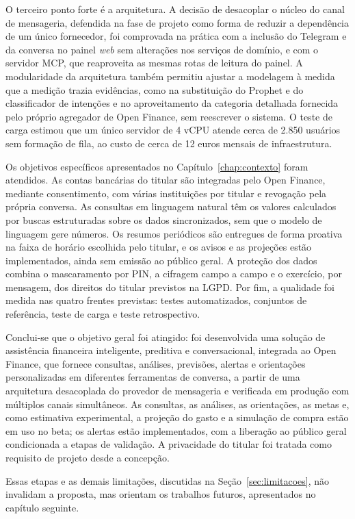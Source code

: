 O terceiro ponto forte é a arquitetura. A decisão de desacoplar o núcleo do canal de mensageria, defendida na fase de projeto como forma de reduzir a dependência de um único fornecedor, foi comprovada na prática com a inclusão do Telegram e da conversa no painel \textit{web} sem alterações nos serviços de domínio, e com o servidor MCP, que reaproveita as mesmas rotas de leitura do painel. A modularidade da arquitetura também permitiu ajustar a modelagem à medida que a medição trazia evidências, como na substituição do Prophet e do classificador de intenções e no aproveitamento da categoria detalhada fornecida pelo próprio agregador de Open Finance, sem reescrever o sistema. O teste de carga estimou que um único servidor de 4 vCPU atende cerca de 2.850 usuários sem formação de fila, ao custo de cerca de 12 euros mensais de infraestrutura.

Os objetivos específicos apresentados no Capítulo~\ref{chap:contexto} foram atendidos. As contas bancárias do titular são integradas pelo Open Finance, mediante consentimento, com várias instituições por titular e revogação pela própria conversa. As consultas em linguagem natural têm os valores calculados por buscas estruturadas sobre os dados sincronizados, sem que o modelo de linguagem gere números. Os resumos periódicos são entregues de forma proativa na faixa de horário escolhida pelo titular, e os avisos e as projeções estão implementados, ainda sem emissão ao público geral. A proteção dos dados combina o mascaramento por PIN, a cifragem campo a campo e o exercício, por mensagem, dos direitos do titular previstos na LGPD. Por fim, a qualidade foi medida nas quatro frentes previstas: testes automatizados, conjuntos de referência, teste de carga e teste retrospectivo.

Conclui-se que o objetivo geral foi atingido: foi desenvolvida uma solução de assistência financeira inteligente, preditiva e conversacional, integrada ao Open Finance, que fornece consultas, análises, previsões, alertas e orientações personalizadas em diferentes ferramentas de conversa, a partir de uma arquitetura desacoplada do provedor de mensageria e verificada em produção com múltiplos canais simultâneos. As consultas, as análises, as orientações, as metas e, como estimativa experimental, a projeção do gasto e a simulação de compra estão em uso no beta; os alertas estão implementados, com a liberação ao público geral condicionada a etapas de validação. A privacidade do titular foi tratada como requisito de projeto desde a concepção.

Essas etapas e as demais limitações, discutidas na Seção~\ref{sec:limitacoes}, não invalidam a proposta, mas orientam os trabalhos futuros, apresentados no capítulo seguinte.
